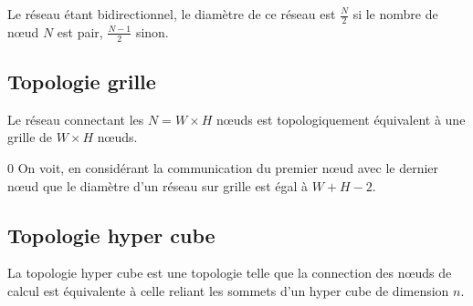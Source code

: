 \documentclass[fleqn,11pt]{article}
\begin{document}
Le réseau étant bidirectionnel, le diamètre de ce réseau est $\frac{N}{2}$ si le nombre
de nœud $N$ est pair, $\frac{N-1}{2}$ sinon.

\subsection{Topologie grille}

Le réseau connectant les $N=W\times H$ nœuds est topologiquement équivalent à
une grille de $W\times H$ nœuds.

0
On voit, en considérant la communication du premier n{\oe}ud avec le dernier
n{\oe}ud que le diamètre d'un réseau sur grille est égal à $W+H-2$.

\subsection{Topologie hyper cube}

La topologie hyper cube est une topologie telle que la connection des n{\oe}uds de calcul
est équivalente à celle reliant les sommets d'un hyper cube de dimension $n$.
\end{document}
